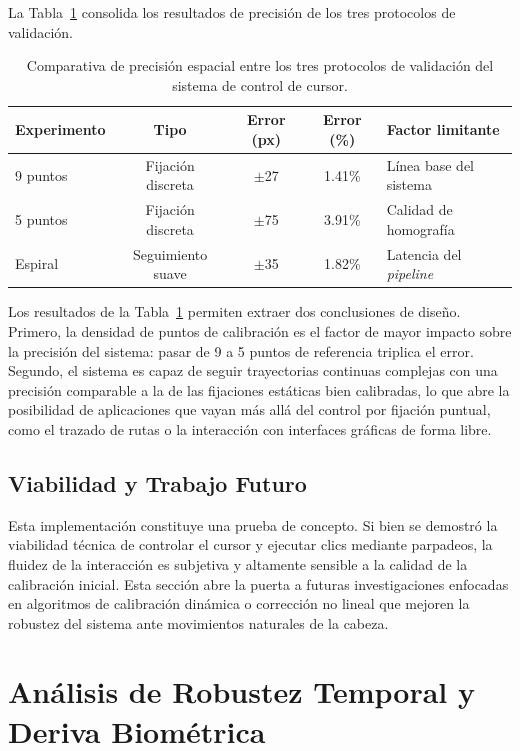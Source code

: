La Tabla~\ref{tab:comparativa_experimentos} consolida los resultados
de precisión de los tres protocolos de validación.
\begin{table}[h!]
	\centering
	\caption[Comparativa de precisión entre los tres protocolos de validación.]{Comparativa de precisión espacial entre los tres protocolos
		de validación del sistema de control de cursor.}
	\label{tab:comparativa_experimentos}
	\vspace{0.2cm}
	\begin{tabular}{lcccl}
		\toprule
		\textbf{Experimento} & \textbf{Tipo} &
		\textbf{Error (px)} & \textbf{Error (\%)} &
		\textbf{Factor limitante} \\
		\midrule
		9 puntos & Fijación discreta & $\pm$27 & 1.41\% &
		Línea base del sistema \\
		5 puntos & Fijación discreta & $\pm$75 & 3.91\% &
		Calidad de homografía \\
		Espiral  & Seguimiento suave & $\pm$35 & 1.82\% &
		Latencia del \textit{pipeline} \\
		\bottomrule
	\end{tabular}
\end{table}

Los resultados de la Tabla~\ref{tab:comparativa_experimentos} permiten
extraer dos conclusiones de diseño.
Primero, la densidad de puntos de
calibración es el factor de mayor impacto sobre la precisión del sistema:
pasar de 9 a 5 puntos de referencia triplica el error.
Segundo, el
sistema es capaz de seguir trayectorias continuas complejas con una
precisión comparable a la de las fijaciones estáticas bien calibradas,
lo que abre la posibilidad de aplicaciones que vayan más allá del control
por fijación puntual, como el trazado de rutas o la
interacción con interfaces gráficas de forma libre.
\subsection{Viabilidad y Trabajo Futuro}

Esta implementación constituye una prueba de concepto.
Si bien se demostró la viabilidad técnica de controlar el cursor y ejecutar clics mediante parpadeos, la fluidez de la interacción es subjetiva y altamente sensible a la calidad de la calibración inicial.
Esta sección abre la puerta a futuras investigaciones enfocadas en algoritmos de calibración dinámica o corrección no lineal que mejoren la robustez del sistema ante movimientos naturales de la cabeza.
\section{Análisis de Robustez Temporal y Deriva Biométrica}


